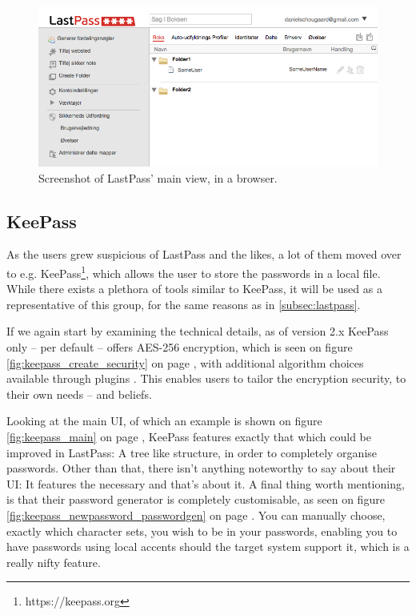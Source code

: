 			\begin{figure}[h!]
				\centering
				\includegraphics[width=\textwidth]{figures/analysis/lastpass_main.png}
				\caption{Screenshot of LastPass' main view, in a browser.}
				\label{fig:lastpass_main}
			\end{figure}

		\subsection*{KeePass}
			As the users grew suspicious of LastPass and the likes, a lot of them moved over to e.g. KeePass\footnote{https://keepass.org}, which allows the user to store the passwords in a local file. While there exists a plethora of tools similar to KeePass,  it will be used as a representative of this group, for the same reasons as in \ref{subsec:lastpass}.

			If we again start by examining the technical details, as of version 2.x KeePass only -- per default -- offers AES-256 encryption, which is seen on figure \ref{fig:keepass_create_security} on page \pageref{fig:keepass_create_security}, with additional algorithm choices available through plugins \cite{keepass_security}. This enables users to tailor the encryption security, to their own needs -- and beliefs. 

			Looking at the main UI, of which an example is shown on figure \ref{fig:keepass_main} on page \pageref{fig:keepass_main}, KeePass features exactly that which could be improved in LastPass: A tree like structure, in order to completely organise passwords. Other than that, there isn't anything noteworthy to say about their UI: It features the necessary and that's about it. A final thing worth mentioning, is that their password generator is completely customisable, as seen on figure \ref{fig:keepass_newpassword_passwordgen} on page \pageref{fig:keepass_newpassword_passwordgen}. You can manually choose, exactly which character sets, you wish to be in your passwords, enabling you to have passwords using local accents should the target system support it, which is a really nifty feature.


